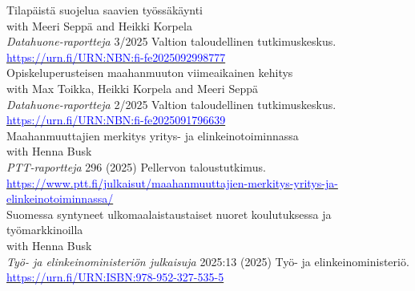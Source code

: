 \documentclass[16pt]{article}
\begin{document}
\noindent  Tilapäistä suojelua saavien työssäkäynti \\
\noindent with Meeri Seppä and Heikki Korpela \\
\noindent \textit{Datahuone-raportteja} 3/2025 Valtion taloudellinen tutkimuskeskus. \\
\noindent \href{https://urn.fi/URN:NBN:fi-fe2025092998777}{\textcolor{blue}{https://urn.fi/URN:NBN:fi-fe2025092998777}} \\

\noindent  Opiskeluperusteisen maahanmuuton viimeaikainen kehitys \\
\noindent with Max Toikka, Heikki Korpela and Meeri Seppä \\
\noindent \textit{Datahuone-raportteja} 2/2025 Valtion taloudellinen tutkimuskeskus. \\
\noindent \href{https://urn.fi/URN:NBN:fi-fe2025091796639 }{\textcolor{blue}{https://urn.fi/URN:NBN:fi-fe2025091796639 }} \\


\noindent  Maahanmuuttajien merkitys yritys- ja elinkeinotoiminnassa \\
\noindent with Henna Busk \\
\noindent \textit{PTT-raportteja} 296 (2025) Pellervon taloustutkimus. \\
\noindent \href{https://www.ptt.fi/julkaisut/maahanmuuttajien-merkitys-yritys-ja-elinkeinotoiminnassa/}{\textcolor{blue}{https://www.ptt.fi/julkaisut/maahanmuuttajien-merkitys-yritys-ja-elinkeinotoiminnassa/}} \\

\noindent Suomessa syntyneet ulkomaalaistaustaiset nuoret koulutuksessa ja työmarkkinoilla \\
\noindent with Henna Busk \\
\noindent \textit{Työ- ja elinkeinoministeriön julkaisuja} 2025:13 (2025) Työ- ja elinkeinoministeriö. \\
\noindent \href{https://urn.fi/URN:ISBN:978-952-327-535-5}{\textcolor{blue}{https://urn.fi/URN:ISBN:978-952-327-535-5}} \\
\end{document}
